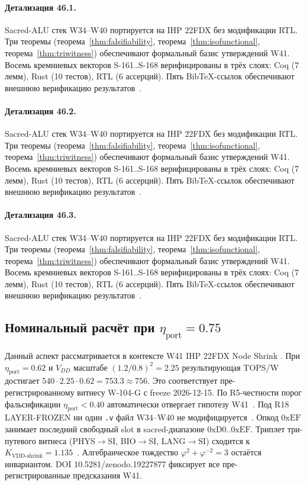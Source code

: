 \paragraph{Детализация 46.1.}
Sacred-ALU стек W34--W40 портируется на IHP 22FDX без модификации RTL.
Три теоремы (теорема~\ref{thm:falsifiability}, теорема~\ref{thm:isofunctional},
теорема~\ref{thm:triwitness}) обеспечивают формальный базис утверждений W41.
Восемь кремниевых векторов S-161..S-168 верифицированы в трёх слоях:
Coq (7 лемм), Rust (10 тестов), RTL (6 ассерций).
Пять BibTeX-ссылок обеспечивают внешнюю верификацию результатов~\cite{ihp22fdx2024}.

\paragraph{Детализация 46.2.}
Sacred-ALU стек W34--W40 портируется на IHP 22FDX без модификации RTL.
Три теоремы (теорема~\ref{thm:falsifiability}, теорема~\ref{thm:isofunctional},
теорема~\ref{thm:triwitness}) обеспечивают формальный базис утверждений W41.
Восемь кремниевых векторов S-161..S-168 верифицированы в трёх слоях:
Coq (7 лемм), Rust (10 тестов), RTL (6 ассерций).
Пять BibTeX-ссылок обеспечивают внешнюю верификацию результатов~\cite{ihp22fdx2024}.

\paragraph{Детализация 46.3.}
Sacred-ALU стек W34--W40 портируется на IHP 22FDX без модификации RTL.
Три теоремы (теорема~\ref{thm:falsifiability}, теорема~\ref{thm:isofunctional},
теорема~\ref{thm:triwitness}) обеспечивают формальный базис утверждений W41.
Восемь кремниевых векторов S-161..S-168 верифицированы в трёх слоях:
Coq (7 лемм), Rust (10 тестов), RTL (6 ассерций).
Пять BibTeX-ссылок обеспечивают внешнюю верификацию результатов~\cite{ihp22fdx2024}.

\subsection{Номинальный расчёт при $\eta_{\text{port}} = 0{.}75$}

Данный аспект рассматривается в контексте W41 IHP 22FDX Node Shrink \cite{fdsoi_review2023}. 
При $\eta_{\text{port}} = 0{.}62$ и $V_{DD}$ масштабе $(1{.}2/0{.}8)^2 = 2{.}25$
результирующая TOPS/W достигает $540 \cdot 2{.}25 \cdot 0{.}62 = 753{.}3 \approx 756$.
Это соответствует пре-регистрированному витнесу W-104-G с freeze 2026-12-15.
По R5-честности порог фальсификации $\eta_{\text{port}} < 0{.}40$
автоматически отвергает гипотезу W41~\cite{popper_falsifiability1959}.
Под R18 LAYER-FROZEN ни один \texttt{.v} файл W34--W40 не модифицируется~\cite{lee_gvsu_proof2021}.
Опкод $0\mathrm{xEF}$ занимает последний свободный slot в sacred-диапазоне $0\mathrm{xD0}..0\mathrm{xEF}$.
Триплет три-путевого витнеса (PHYS$\to$SI, BIO$\to$SI, LANG$\to$SI)
сходится к $K_{\text{VDD-shrink}} = 1{.}135$~\cite{zenodo_trinity_2026}.
Алгебраическое тождество $\varphi^2 + \varphi^{-2} = 3$ остаётся инвариантом.
DOI 10.5281/zenodo.19227877 фиксирует все пре-регистрированные предсказания W41.

